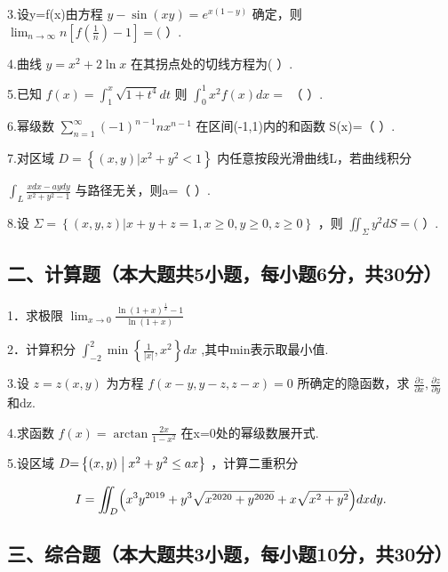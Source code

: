 \documentclass[11pt,fontset=fandol]{ctexart}
\begin{document}
3.设y=f(x)由方程 \(y - \sin ( x y ) = e ^ { x ( 1 - y ) }\) 确定，则
\(\lim _ { n \to \infty } n \left[ f \left( { \frac { 1 } { n } } \right) - 1 \right] = (\)
）.

4.曲线 \(y = x ^ { 2 } + 2 \ln x\) 在其拐点处的切线方程为( ）.

5.已知
\(f ( x ) = \int _ { 1 } ^ { x } { \sqrt { 1 + t ^ { 4 } } } d t\) 则
\(\int _ { 0 } ^ { 1 } x ^ { 2 } f ( x ) d x =\) （ ）.

6.幂级数
\(\sum _ { n = 1 } ^ { \infty } ( - 1 ) ^ { n - 1 } n x ^ { n - 1 }\)
在区间(-1,1)内的和函数 S(x)=（ ）.

7.对区域
\(D { = } \left\{ ( x , y ) \vert x ^ { 2 } + y ^ { 2 } < 1 \right\}\)
内任意按段光滑曲线L，若曲线积分

\(\int _ { L } { \frac { x d x - a y d y } { x ^ { 2 } + y ^ { 2 } - 1 } }\)
与路径无关，则a=（ ）.

8.设
\(\Sigma = \left\{ ( x , y , z ) \left| x + y + z = 1 , x \geq 0 , y \geq 0 , z \geq 0 \right. \right\}\)
，则 \(\iint _ { \Sigma } y ^ { 2 } d S = (\) ）.

\subsection{二、计算题（本大题共5小题，每小题6分，共30分）}\label{ux4e8cux8ba1ux7b97ux9898ux672cux5927ux9898ux51715ux5c0fux9898ux6bcfux5c0fux98986ux5206ux517130ux5206}

1．求极限
\(\lim _ { x \to 0 } { \frac { \ln ( 1 + x ) ^ { \frac { 1 } { x } } - 1 } { \ln ( 1 + x ) } }\)

2．计算积分
\(\int _ { - 2 } ^ { 2 } \operatorname* { m i n } \left\{ { \frac { 1 } { \left| x \right| } } , x ^ { 2 } \right\} d x\)
,其中min表示取最小值.

3.设 \(z = z ( x , y )\) 为方程 \(f ( x - y , y - z , z - x ) = 0\)
所确定的隐函数，求
\(\frac { \partial z } { \partial x } , \frac { \partial z } { \partial y }\)
和dz.

4.求函数 \(f ( x ) = \arctan { \frac { 2 x } { 1 - x ^ { 2 } } }\)
在x=0处的幂级数展开式.

5.设区域
\(D { = } \left\{ \left( x , y \right) \bigm | x ^ { 2 } + y ^ { 2 } \leq a x \right\}\)
，计算二重积分

\[
I = \iint _ { D } \Bigl ( x ^ { 3 } y ^ { 2 0 1 9 } + y ^ { 3 } \sqrt { x ^ { 2 0 2 0 } + y ^ { 2 0 2 0 } } + x \sqrt { x ^ { 2 } + y ^ { 2 } } \Bigr ) d x d y .
\]

\subsection{三、综合题（本大题共3小题，每小题10分，共30分）}\label{ux4e09ux7efcux5408ux9898ux672cux5927ux9898ux51713ux5c0fux9898ux6bcfux5c0fux989810ux5206ux517130ux5206}
\end{document}
